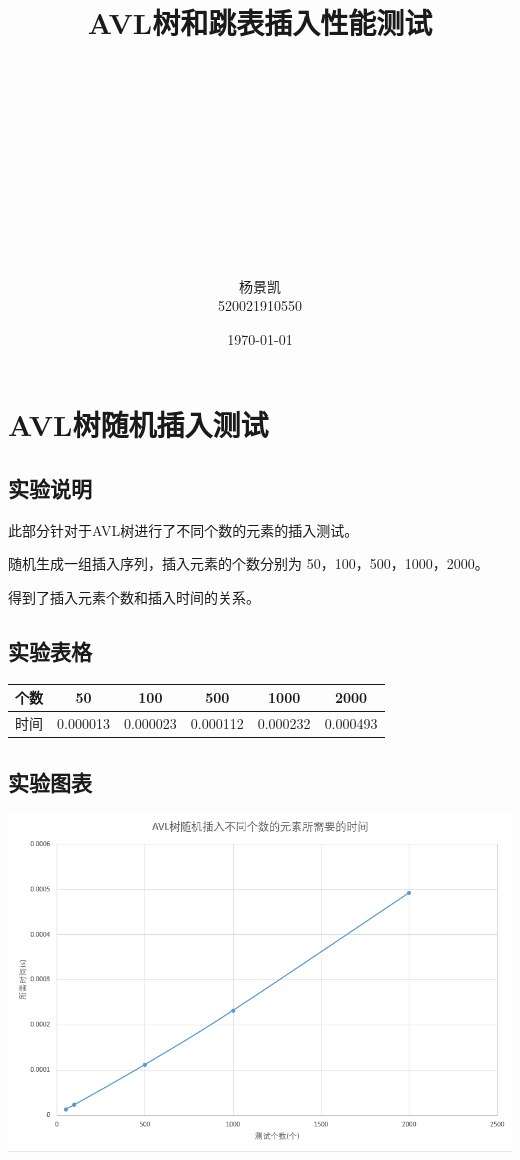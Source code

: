 \documentclass[UTF8]{ctexart}
\title{AVL树和跳表插入性能测试}
\author{\\
\\
\\
\\
\\
\\
\\
\\
\\
\\
\\
杨景凯\\
520021910550
  }
\date{\today}
\begin{document}
\maketitle
\clearpage
\tableofcontents
\clearpage
\section{AVL树随机插入测试}
\subsection{实验说明}
此部分针对于AVL树进行了不同个数的元素的插入测试。

随机生成一组插入序列，插入元素的个数分别为 50，100，500，1000，2000。

得到了插入元素个数和插入时间的关系。
\subsection{实验表格}
\begin{center}
    \begin{tabular}{|c|c|c|c|c|c|}
        \hline
        个数&	50&	100&	500&	1000&	2000\\
        \hline
        时间&	0.000013&	0.000023&	0.000112&	0.000232&	0.000493\\
        \hline
    \end{tabular}
\end{center}
\subsection{实验图表}
\begin{center}
    \includegraphics[scale=0.5]{AVLinsert.png}
\end{center}
\end{document}
